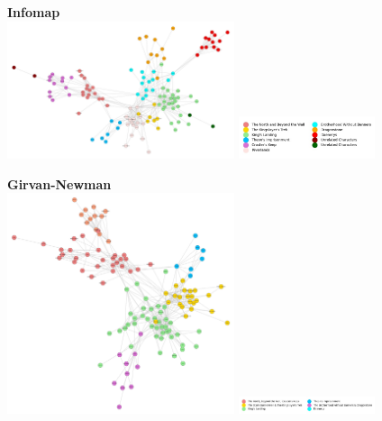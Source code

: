 \documentclass[10pt,twocolumn,letterpaper]{article}
\begin{document}
\begin{center}
    \textbf{Infomap}  \\
    \includegraphics[width=0.5\textwidth]{img/s3/communities_infomap.jpg}
    \includegraphics[width=0.3\textwidth]{img/s3/infomap_legend.jpg}\\
    \caption{\small{$\#communities=11$, $modularity=0.616$}}
\end{center}


\begin{center}
    \textbf{Girvan-Newman} \\
    \includegraphics[width=0.5\textwidth]{img/s3/communities_g-n.jpg}
    \includegraphics[width=0.3\textwidth]{img/s3/g-n_legend.jpg}\\
    \caption{\small{$\#communities=6$, $modularity=0.589$}}
\end{center}
\end{document}
